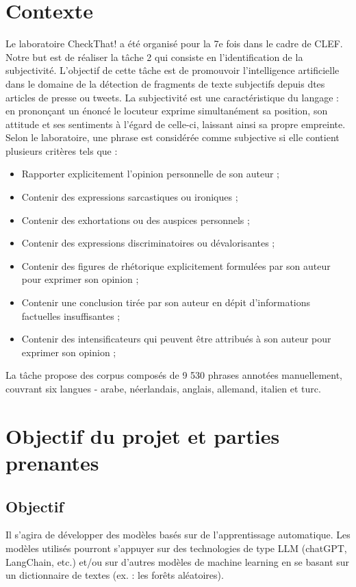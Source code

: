 \documentclass[11pt]{rapport_class}
\begin{document}
\chapter{Contexte}
\qquad Le laboratoire CheckThat! a été organisé pour la 7e fois dans le cadre de CLEF. Notre but est de réaliser la tâche 2 qui consiste en l’identification de la subjectivité. L'objectif de cette tâche est de promouvoir l’intelligence artificielle dans le domaine de la détection de fragments de texte subjectifs depuis dtes articles de presse ou tweets. La subjectivité est une caractéristique du langage : en prononçant un énoncé le locuteur exprime simultanément sa position, son attitude et ses sentiments à l'égard de celle-ci, laissant ainsi sa propre empreinte. Selon le laboratoire, une phrase est considérée comme subjective si elle contient plusieurs critères tels que :
\begin{itemize}
    \item Rapporter explicitement l'opinion personnelle de son auteur ;
    \item Contenir des expressions sarcastiques ou ironiques ;
    \item Contenir des exhortations ou des auspices personnels ;
    \item Contenir des expressions discriminatoires ou dévalorisantes ;
    \item Contenir des figures de rhétorique explicitement formulées par son auteur pour exprimer son opinion ;
    \item Contenir une conclusion tirée par son auteur en dépit d'informations factuelles insuffisantes ;
    \item Contenir des intensificateurs qui peuvent être attribués à son auteur pour exprimer son opinion ;
\end{itemize}
La tâche propose des corpus composés de 9 530 phrases annotées manuellement, couvrant six langues - arabe, néerlandais, anglais, allemand, italien et turc.

\chapter{Objectif du projet et parties prenantes}
\section{Objectif}
\qquad Il s'agira de développer des modèles basés sur de l'apprentissage automatique. Les modèles utilisés pourront s’appuyer sur des technologies de type  LLM (chatGPT, LangChain, etc.) et/ou sur d'autres modèles de machine learning en se basant sur un dictionnaire de textes (ex. : les forêts aléatoires).
\end{document}
